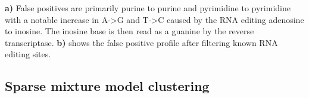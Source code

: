 \begin{table}[htb]

\begin{centering}
\caption{RNA editing as a source of false positive variant calls}\label{table:rnaediting}
\hfil
{}
\textbf{a)} False positives are primarily purine to purine and pyrimidine to pyrimidine with a notable increase in A->G and T->C caused by the RNA editing adenosine to inosine. The inosine base is then read as a guanine by the reverse transcriptase. \textbf{b)} shows the false positive profile after filtering known RNA editing sites.

\end{centering}
\end{table}



\subsection{Sparse mixture model clustering}






